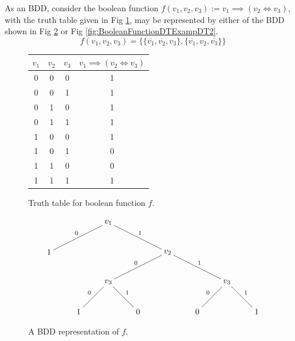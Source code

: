 \documentclass[12pt]{book}
\begin{document}
\begin{examp}\label{exp:bdd}
      As an BDD, consider the boolean function $f(v_1,v_2,v_3) := v_1 \implies (v_2 \iff v_3)$, with the truth table given in Fig \ref{fig:BooleanFunctionDTExampTT}, 
	  may be represented by either of the BDD shown in Fig \ref{fig:BooleanFunctionDTExampDT1} or Fig \ref{fig:BooleanFunctionDTExampDT2}. 
      $$f(v_1,v_2,v_3) = \{ \{ \overline{v_1},\overline{v_2}, v_3 \}, \{ \overline{v_1}, v_2, \overline{v_3}\} \}$$
      \begin{figure}[h]
            \centering
            \begin{tabular}{|c|c|c|c|} 
                  \hline
                  $v_1$ & $v_2$ & $v_3$ & $v_1 \implies (v_2 \iff v_3)$ \\ \hline
                  0 & 0 & 0 & 1 \\ \hline
                  0 & 0 & 1 & 1 \\ \hline
                  0 & 1 & 0 & 1 \\ \hline
                  0 & 1 & 1 & 1 \\ \hline
                  1 & 0 & 0 & 1 \\ \hline
                  1 & 0 & 1 & 0 \\ \hline
                  1 & 1 & 0 & 0 \\ \hline
                  1 & 1 & 1 & 1 \\ \hline
            \end{tabular}
            \caption{Truth table for boolean function $f$.}
            \label{fig:BooleanFunctionDTExampTT}
      \end{figure}
      \begin{figure}[h]
            \centering
            \begin{displaymath}
                  \xygraph{
                  []{v_1} ( 
                  - [dll]{1}_0 (),
                  - [drr]{v_2}^1 (
                  - [dll]{v_3}_0 (
                  - [dl]{1}_0 (),
                  - [dr]{0}^1 ()
                  ),
                  -[drr]{v_3}^1 (
                  - [dl]{0}_0 (),
                  - [dr]{1}^1 ()
                  )
                  )
                  )
                  }
            \end{displaymath}
            \caption{A BDD representation of $f$.}
            \label{fig:BooleanFunctionDTExampDT1}
      \end{figure}
      \begin{figure}[h]
            \centering

\end{figure}
\end{examp}
\end{document}
